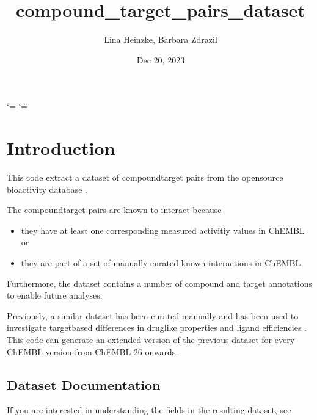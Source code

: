 \documentclass[letterpaper,10pt,english]{sphinxmanual}
\title{compound\_target\_pairs\_dataset}
\date{Dec 20, 2023}
\author{Lina Heinzke, Barbara Zdrazil}
\begin{document}
\ifdefined\shorthandoff
  \ifnum\catcode`\=\string=\active\shorthandoff{=}\fi
  \ifnum\catcode`\"=\active{}\fi
\fi

\pagestyle{empty}
\sphinxmaketitle
\pagestyle{plain}
\sphinxtableofcontents
\pagestyle{normal}
\label{\detokenize{index::doc}}


\sphinxstepscope


\chapter{Introduction}
\label{\detokenize{introduction:introduction}}\label{\detokenize{introduction::doc}}
\sphinxAtStartPar
This code extract a dataset of compound\sphinxhyphen{}target pairs from the open\sphinxhyphen{}source bioactivity database  .

\sphinxAtStartPar
The compound\sphinxhyphen{}target pairs are known to interact because
\begin{itemize}
\item {} 
\sphinxAtStartPar
they have at least one corresponding measured activitiy values in ChEMBL or

\item {} 
\sphinxAtStartPar
they are part of a set of manually curated known interactions in ChEMBL.

\end{itemize}

\sphinxAtStartPar
Furthermore, the dataset contains a number of compound and target annotations to enable future analyses.

\sphinxAtStartPar
Previously, a similar dataset has been curated manually and has been used to investigate target\sphinxhyphen{}based differences in drug\sphinxhyphen{}like properties and ligand efficiencies .
This code can generate an extended version of the previous dataset for every ChEMBL version from ChEMBL 26 onwards.


\section{Dataset Documentation}
\label{\detokenize{introduction:dataset-documentation}}
\sphinxAtStartPar
If you are interested in understanding the fields in the resulting dataset, see {\hyperref[\detokenize{columns_docs::doc}]{}}
\end{document}
